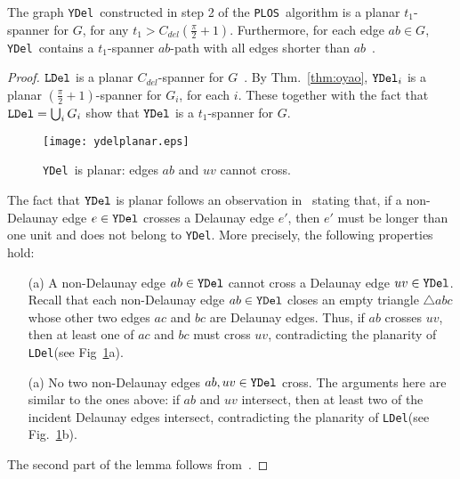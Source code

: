 \documentclass{llncs}
\newcommand{\ABox}{
\raisebox{3pt}{\framebox[6pt]{\rule{6pt}{0pt}}}
}
\newcommand{\palg}{{\tt PLOS}}
\newcommand{\ydel}{{\tt YDel}}
\newcommand{\ldel}{{\tt LDel}}
\begin{document}
\begin{lemma}
The graph \ydel\ constructed in step 2 of the \palg\ algorithm is a planar $t_1$-spanner for $G$, for any $t_1 > C_{del}(\frac{\pi}{2}+1)$. Furthermore, for each edge $ab \in G$, \ydel\ contains a $t_1$-spanner $ab$-path with all edges shorter than $ab$~\emph{\cite{WangLi03}}.
\label{lem:shortedges}
\end{lemma}
\begin{proof}
$\ldel$ is a planar $C_{del}$-spanner for $G$~\cite{LCWW03}. By Thm.~\ref{thm:oyao}, $\ydel_i$ is a planar $(\frac{\pi}{2}+1)$-spanner for $G_i$, for each $i$. These together with the fact that $\ldel = \bigcup_i G_i$ show that $\ydel$ is a $t_1$-spanner for $G$.

\begin{figure}[htbp]
\centering
\texttt{[image: ydelplanar.eps]}
\caption{\ydel\ is planar: edges $ab$ and $uv$ cannot cross.}
\label{fig:ydelplanar}
\end{figure}


The fact that $\ydel$ is planar follows an observation in~\cite{WangLi03} stating that, if a non-Delaunay edge $e \in \ydel$ crosses a Delaunay edge $e'$, then $e'$ must be longer than one unit and does not belong to \ydel. More precisely, the following properties hold:
\begin{itemize}
\item[(a)] A non-Delaunay edge $ab \in \ydel$ cannot cross a Delaunay edge $uv \in \ydel$. Recall that each non-Delaunay edge $ab \in \ydel$ closes an empty triangle $\triangle abc$ whose other two edges $ac$ and $bc$ are Delaunay edges. Thus, if $ab$ crosses $uv$, then at least one of $ac$ and $bc$ must cross $uv$, contradicting the planarity of \ldel (see Fig~\ref{fig:ydelplanar}a).

\item[(a)] No two non-Delaunay edges $ab, uv \in \ydel$ cross. The arguments here are similar to the ones above: if $ab$ and $uv$ intersect, then at least two of the incident Delaunay edges intersect, contradicting the planarity of \ldel (see Fig.~\ref{fig:ydelplanar}b).
\end{itemize}
The second part of the lemma follows from~\cite{WangLi03}. \hfill\ABox
\end{proof}
\end{document}
